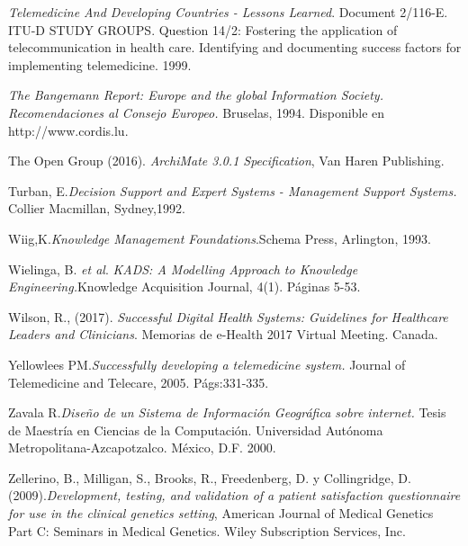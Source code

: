 \begin{thebibliography}{}
 \textit{Telemedicine And Developing Countries - Lessons Learned}. Document 2/116-E. ITU-D STUDY GROUPS. Question 14/2: Fostering the application of telecommunication in health care.  Identifying and documenting success factors for implementing telemedicine. 1999.

 \textit{The Bangemann Report: Europe and the global Information Society. Recomendaciones al Consejo Europeo.} Bruselas, 1994. Disponible en http://www.cordis.lu.

 The Open Group (2016). \textit{ArchiMate 3.0.1 Specification}, Van Haren Publishing.

 Turban, E.\textit{Decision Support and Expert Systems - Management Support Systems.} Collier Macmillan, Sydney,1992.

 Wiig,K.\textit{Knowledge Management Foundations}.Schema Press, Arlington, 1993. 

 Wielinga, B. \textit{et al}. \textit{KADS: A Modelling Approach to Knowledge Engineering.}Knowledge Acquisition Journal, 4(1). Páginas 5-53.

 Wilson, R., (2017). \textit{Successful Digital Health Systems: Guidelines for Healthcare Leaders and Clinicians}. Memorias de e-Health 2017 Virtual Meeting. Canada.

 Yellowlees PM.\textit{Successfully developing a telemedicine system.} Journal of Telemedicine and Telecare, 2005. Págs:331-335.

 Zavala R.\textit{Diseño de un Sistema de Información Geográfica sobre internet.} Tesis de Maestría en Ciencias de la Computación. Universidad Autónoma Metropolitana-Azcapotzalco. México, D.F. 2000.


 Zellerino, B.,  Milligan, S., Brooks, R., Freedenberg, D. y Collingridge, D. (2009).\textit{Development, testing, and validation of a patient satisfaction questionnaire for use in the clinical genetics setting}, American Journal of Medical Genetics Part C: Seminars in Medical Genetics. Wiley Subscription Services, Inc.

\end{thebibliography}
